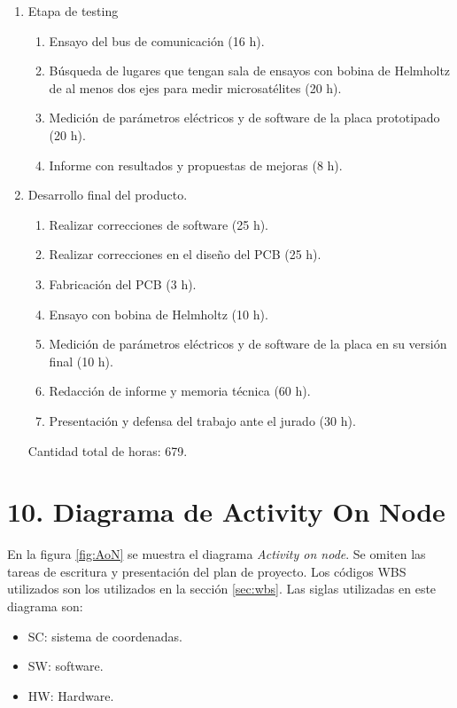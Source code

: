 \documentclass[
11pt, %
]{charter}
\begin{document}
\begin{enumerate}
\begin{enumerate}
		\end{enumerate}
	\item Etapa de testing
		\begin{enumerate}
			\item Ensayo del bus de comunicación (16 h). 
			\item Búsqueda de lugares que tengan sala de ensayos  con bobina de Helmholtz de al menos dos ejes para medir microsatélites (20 h).
			\item  Medición de parámetros eléctricos y de software de la placa prototipado (20 h).
			\item  Informe con resultados y propuestas de mejoras (8 h).	
		\end{enumerate}
	\item Desarrollo final del producto. 
		\begin{enumerate}
			\item Realizar correcciones de software (25 h). 
			\item Realizar correcciones en el diseño del PCB (25 h).
			\item Fabricación del PCB (3 h). 
			\item Ensayo con bobina de Helmholtz (10 h). 		
			\item Medición de parámetros eléctricos y de software de la placa en su versión final (10 h). 
			\item Redacción de informe y memoria técnica (60 h).
			\item Presentación y defensa del trabajo ante el jurado (30 h). 
		\end{enumerate}

Cantidad total de horas: 679.  


\end{enumerate}





\section{10. Diagrama de Activity On Node}
\label{sec:AoN}
	En la figura \ref{fig:AoN} se muestra el diagrama  \textit{Activity on node}. Se omiten las tareas de escritura y presentación del plan de proyecto. Los códigos WBS utilizados son los utilizados en la sección \ref{sec:wbs}. Las siglas utilizadas en este diagrama son: 
	\begin{itemize}
		\item SC: sistema de coordenadas. 
		\item SW: software.
		\item HW: Hardware.
	\end{itemize}
\end{document}
